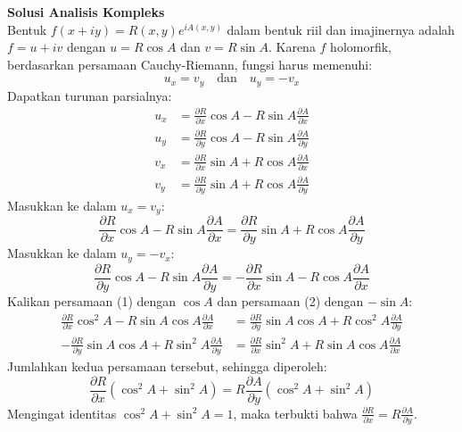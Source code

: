 \documentclass{article}
\begin{document}
\textbf{Solusi Analisis Kompleks} \\
Bentuk $f(x+iy) = R(x,y)e^{iA(x,y)}$ dalam bentuk riil dan imajinernya adalah $f = u + iv$ dengan $u = R\cos A$ dan $v = R\sin A$. Karena $f$ holomorfik, berdasarkan persamaan Cauchy-Riemann, fungsi harus memenuhi:
\[ u_x = v_y \quad \text{dan} \quad u_y = -v_x \]
Dapatkan turunan parsialnya:
\begin{align*}
  u_x & = \frac{\partial R}{\partial x}\cos A - R\sin A \frac{\partial A}{\partial x} \\
  u_y & = \frac{\partial R}{\partial y}\cos A - R\sin A \frac{\partial A}{\partial y} \\
  v_x & = \frac{\partial R}{\partial x}\sin A + R\cos A \frac{\partial A}{\partial x} \\
  v_y & = \frac{\partial R}{\partial y}\sin A + R\cos A \frac{\partial A}{\partial y}
\end{align*}
Masukkan ke dalam $u_x = v_y$:
\[ \frac{\partial R}{\partial x}\cos A - R\sin A \frac{\partial A}{\partial x} = \frac{\partial R}{\partial y}\sin A + R\cos A \frac{\partial A}{\partial y} \tag{1} \]
Masukkan ke dalam $u_y = -v_x$:
\[ \frac{\partial R}{\partial y}\cos A - R\sin A \frac{\partial A}{\partial y} = -\frac{\partial R}{\partial x}\sin A - R\cos A \frac{\partial A}{\partial x} \tag{2} \]
Kalikan persamaan (1) dengan $\cos A$ dan persamaan (2) dengan $-\sin A$:
\begin{align*}
  \frac{\partial R}{\partial x}\cos^2 A - R\sin A\cos A \frac{\partial A}{\partial x}  & = \frac{\partial R}{\partial y}\sin A\cos A + R\cos^2 A \frac{\partial A}{\partial y} \\
  -\frac{\partial R}{\partial y}\sin A\cos A + R\sin^2 A \frac{\partial A}{\partial y} & = \frac{\partial R}{\partial x}\sin^2 A + R\sin A\cos A \frac{\partial A}{\partial x}
\end{align*}
Jumlahkan kedua persamaan tersebut, sehingga diperoleh:
\[ \frac{\partial R}{\partial x}(\cos^2A + \sin^2A) = R\frac{\partial A}{\partial y}(\cos^2A + \sin^2A) \]
Mengingat identitas $\cos^2A + \sin^2A = 1$, maka terbukti bahwa $\frac{\partial R}{\partial x} = R\frac{\partial A}{\partial y}$.

\vspace{0.5cm}
\end{document}
